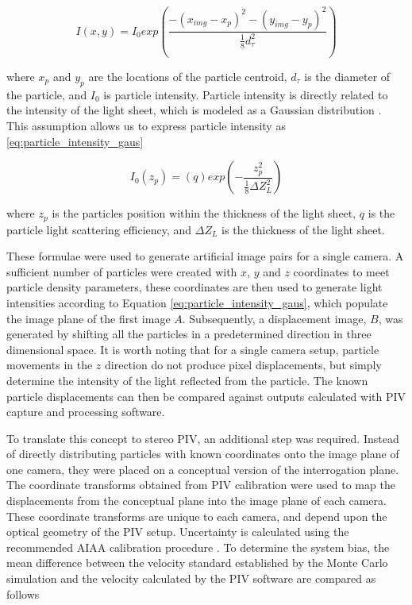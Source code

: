 \begin{equation}
	I(x,y) = I_0exp \left( \frac{-(x_{img} - x_p)^2 - (y_{img} - y_p)^2}
	{\frac{1}{8}d_\tau^2} \right)
	\label{eq:piv_gaussian_uncertainty}
\end{equation}

\noindent
where $x_p$ and $y_p$ are the locations of the particle centroid, $d_\tau$ is 
the diameter of the particle, and $I_0$ is particle intensity. Particle 
intensity is directly related to the intensity of the light sheet, which is 
modeled as a Gaussian distribution \cite{PIVuncertAIAA}. This assumption allows 
us 
to express particle intensity as \ref{eq:particle_intensity_gaus}

\begin{equation}
	I_0(z_p) = (q)exp\left(- \frac{z_p^2}{\frac{1}{8}\Delta Z_L^2}\right)
	\label{eq:particle_intensity_gaus}
\end{equation}

\noindent
where $z_p$ is the particles position within the thickness of the light sheet, 
$q$ is the particle light scattering efficiency, and $\Delta Z_L$ is the 
thickness of the light sheet.

These formulae were used to generate artificial image pairs for a single 
camera. 
A sufficient number of particles were created with $x$, $y$ and $z$ coordinates 
to meet particle density parameters, these coordinates are then 
used to generate light intensities according to Equation 
\ref{eq:particle_intensity_gaus}, which populate the image plane of the first 
image $A$. Subsequently, a displacement image, $B$, was generated by shifting 
all the 
particles in a predetermined direction in three dimensional space. It is worth 
noting that for a single camera setup, particle movements in the $z$ direction 
do not produce pixel displacements, but simply determine the intensity of the 
light reflected from the particle. The known particle displacements can then be 
compared against outputs calculated with PIV capture and processing software.

To translate this concept to stereo PIV, an additional step was required. 
Instead of directly distributing particles with known coordinates onto the 
image 
plane of one camera, they were placed on a conceptual version of the 
interrogation plane. The coordinate transforms obtained from PIV calibration 
were used to map the displacements from the conceptual plane into the image 
plane of each camera. These coordinate transforms are unique to each camera, 
and depend upon the optical geometry of the PIV setup. Uncertainty is 
calculated using the recommended AIAA calibration procedure 
\cite{PIVuncertAIAA}. To determine the system bias, the mean difference between 
the velocity standard established by the Monte Carlo simulation and the 
velocity calculated by the PIV software are compared as follows

